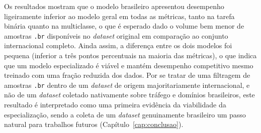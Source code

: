 \begin{table}[h]
\centering
\caption{Modelo especializado em domínios .br vs. modelo geral -- classificação binária}
\label{tab:br-binario}
\footnotesize
{}
\end{table}
 
\begin{table}[h]
\centering
\caption{Modelo especializado em domínios .br vs. modelo geral -- classificação multiclasse}
\label{tab:br-multiclasse}
\footnotesize
{}
\end{table}


Os resultados mostram que o modelo brasileiro apresentou desempenho ligeiramente inferior ao modelo geral em todas as métricas, tanto na tarefa binária quanto na multiclasse, o que é esperado dado o volume bem menor de amostras \texttt{.br} disponíveis no \textit{dataset} original em comparação ao conjunto internacional completo. Ainda assim, a diferença entre os dois modelos foi pequena (inferior a três pontos percentuais na maioria das métricas), o que indica que um modelo especializado é viável e mantém desempenho competitivo mesmo treinado com uma fração reduzida dos dados. Por se tratar de uma filtragem de amostras \texttt{.br} dentro de um \textit{dataset} de origem majoritariamente internacional, e não de um \textit{dataset} coletado nativamente sobre tráfego e domínios brasileiros, este resultado é interpretado como uma primeira evidência da viabilidade da especialização, sendo a coleta de um \textit{dataset} genuinamente brasileiro um passo natural para trabalhos futuros (Capítulo~\ref{cap:conclusao}).

